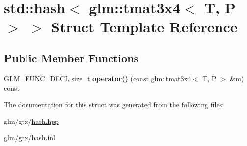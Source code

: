 \hypertarget{structstd_1_1hash_3_01glm_1_1tmat3x4_3_01T_00_01P_01_4_01_4}{\section{std\-:\-:hash$<$ glm\-:\-:tmat3x4$<$ T, P $>$ $>$ Struct Template Reference}
\label{structstd_1_1hash_3_01glm_1_1tmat3x4_3_01T_00_01P_01_4_01_4}
}
\subsection*{Public Member Functions}
\begin{DoxyCompactItemize}
\item 
\hypertarget{structstd_1_1hash_3_01glm_1_1tmat3x4_3_01T_00_01P_01_4_01_4_aa3caca7741839958a871770ca70a7163}{G\-L\-M\-\_\-\-F\-U\-N\-C\-\_\-\-D\-E\-C\-L size\-\_\-t {\bfseries operator()} (const \hyperlink{structglm_1_1tmat3x4}{glm\-::tmat3x4}$<$ T, P $>$ \&m) const }\label{structstd_1_1hash_3_01glm_1_1tmat3x4_3_01T_00_01P_01_4_01_4_aa3caca7741839958a871770ca70a7163}

\end{DoxyCompactItemize}


The documentation for this struct was generated from the following files\-:\begin{DoxyCompactItemize}
\item 
glm/gtx/\hyperlink{hash_8hpp}{hash.\-hpp}\item 
glm/gtx/\hyperlink{hash_8inl}{hash.\-inl}\end{DoxyCompactItemize}
